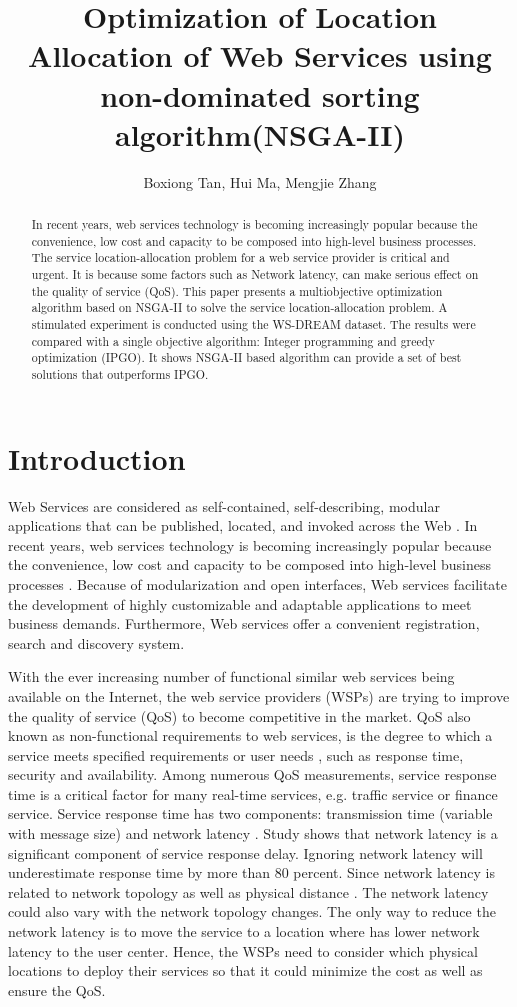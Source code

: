 \documentclass{llncs}
\title{
Optimization of Location Allocation of Web Services using non-dominated sorting algorithm(NSGA-II)
}
\author{Boxiong Tan, Hui Ma, Mengjie Zhang}
\institute{School of Engineering and Computer Science,
\\Victoria University of Wellington, New Zealand \\
\email{\{Boxiong.Tan, Hui.Ma, Mengjie.Zhang\}@ecs.vuw.ac.nz}}
\begin{document}
\maketitle

\begin{abstract}
In recent years, web services technology is becoming increasingly popular because the convenience, 
low cost and capacity to be composed into high-level business processes. 
The service location-allocation problem for a web service provider is critical and urgent. 
It is because some factors such as Network latency, can make serious effect on the quality of service (QoS). 
This paper presents a multiobjective optimization algorithm based on NSGA-II to solve the service location-allocation problem. 
A stimulated experiment is conducted using the WS-DREAM dataset. 
The results were compared with a single objective algorithm: Integer programming and greedy optimization (IPGO). 
It shows NSGA-II based algorithm can provide a set of best solutions that outperforms IPGO.
\end{abstract}

\section{Introduction}
Web Services are considered as self-contained, self-describing, modular applications that can be published, located, and invoked across the Web \cite{Ran}. 
In recent years, web services technology is becoming increasingly popular because the convenience, low cost and capacity to be composed into high-level business processes \cite{Aboolian}.
Because of modularization and open interfaces, Web services facilitate the development of highly 
customizable and adaptable applications to meet business demands. Furthermore, Web services offer a 
convenient registration, search  and discovery system.

With the ever increasing number of functional similar web services being available on the Internet, the web service providers (WSPs) are trying to improve the quality of service (QoS) to become competitive in the market.  
QoS also known as non-functional requirements to  web services, is the degree to which a service meets specified requirements or user needs \cite{4061431}, such as response time, security and availability. 
Among numerous QoS measurements, service response time is a critical factor for many real-time services, e.g. traffic service or finance service. 
Service response time has two components: transmission time (variable with message size) and network latency \cite{Johansson}. 
Study \cite{916684} shows that network latency is a significant component of service response delay.
Ignoring network latency will underestimate response time by more than 80 percent. Since network latency is related to network topology as well as physical distance \cite{distanceMetrics}. 
The network latency could also vary with the network topology changes.
The only way to reduce the network latency is to move the service to a location where has lower network latency to the user center. 
Hence, the WSPs need to consider which physical locations to deploy their services so that it could minimize the cost as well as ensure the QoS.
\end{document}
